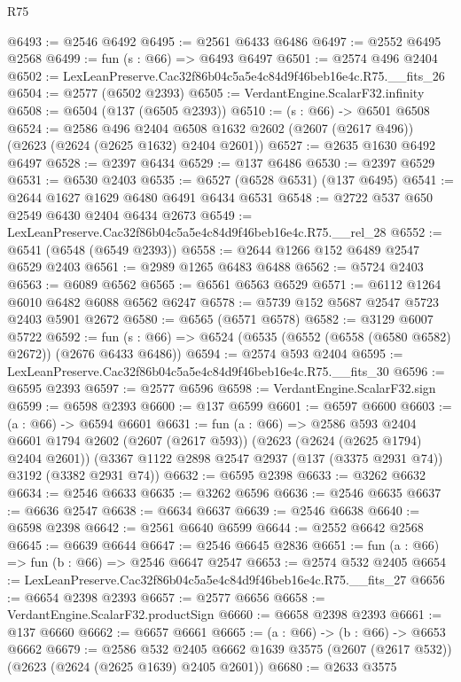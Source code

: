 \begin{lexlean}{R75}
\begin{coremodule}
@6493 := @2546 @6492
@6495 := @2561 @6433 @6486
@6497 := @2552 @6495 @2568
@6499 := fun (s : @66) => @6493 @6497
@6501 := @2574 @496 @2404
@6502 := LexLeanPreserve.Cac32f86b04c5a5e4c84d9f46beb16e4c.R75.__fits_26
@6504 := @2577 (@6502 @2393)
@6505 := VerdantEngine.ScalarF32.infinity
@6508 := @6504 (@137 (@6505 @2393))
@6510 := (s : @66) -> @6501 @6508
@6524 := @2586
    @496
    @2404
    @6508
    @1632
    @2602
    (@2607 (@2617 @496))
    (@2623 (@2624 (@2625 @1632) @2404 @2601))
@6527 := @2635 @1630 @6492 @6497
@6528 := @2397 @6434
@6529 := @137 @6486
@6530 := @2397 @6529
@6531 := @6530 @2403
@6535 := @6527 (@6528 @6531) (@137 @6495)
@6541 := @2644 @1627 @1629 @6480 @6491 @6434 @6531
@6548 := @2722 @537 @650 @2549 @6430 @2404 @6434 @2673
@6549 := LexLeanPreserve.Cac32f86b04c5a5e4c84d9f46beb16e4c.R75.__rel_28
@6552 := @6541 (@6548 (@6549 @2393))
@6558 := @2644 @1266 @152 @6489 @2547 @6529 @2403
@6561 := @2989 @1265 @6483 @6488
@6562 := @5724 @2403
@6563 := @6089 @6562
@6565 := @6561 @6563 @6529
@6571 := @6112 @1264 @6010 @6482 @6088 @6562 @6247
@6578 := @5739 @152 @5687 @2547 @5723 @2403 @5901 @2672
@6580 := @6565 (@6571 @6578)
@6582 := @3129 @6007 @5722
@6592 := fun (s : @66) => @6524 (@6535 (@6552 (@6558 (@6580 @6582) @2672)) (@2676 @6433 @6486))
@6594 := @2574 @593 @2404
@6595 := LexLeanPreserve.Cac32f86b04c5a5e4c84d9f46beb16e4c.R75.__fits_30
@6596 := @6595 @2393
@6597 := @2577 @6596
@6598 := VerdantEngine.ScalarF32.sign
@6599 := @6598 @2393
@6600 := @137 @6599
@6601 := @6597 @6600
@6603 := (a : @66) -> @6594 @6601
@6631 := fun (a : @66) =>
  @2586
    @593
    @2404
    @6601
    @1794
    @2602
    (@2607 (@2617 @593))
    (@2623 (@2624 (@2625 @1794) @2404 @2601))
    (@3367 @1122 @2898 @2547 @2937 (@137 (@3375 @2931 @74)) @3192 (@3382 @2931 @74))
@6632 := @6595 @2398
@6633 := @3262 @6632
@6634 := @2546 @6633
@6635 := @3262 @6596
@6636 := @2546 @6635
@6637 := @6636 @2547
@6638 := @6634 @6637
@6639 := @2546 @6638
@6640 := @6598 @2398
@6642 := @2561 @6640 @6599
@6644 := @2552 @6642 @2568
@6645 := @6639 @6644
@6647 := @2546 @6645 @2836
@6651 := fun (a : @66) => fun (b : @66) => @2546 @6647 @2547
@6653 := @2574 @532 @2405
@6654 := LexLeanPreserve.Cac32f86b04c5a5e4c84d9f46beb16e4c.R75.__fits_27
@6656 := @6654 @2398 @2393
@6657 := @2577 @6656
@6658 := VerdantEngine.ScalarF32.productSign
@6660 := @6658 @2398 @2393
@6661 := @137 @6660
@6662 := @6657 @6661
@6665 := (a : @66) -> (b : @66) -> @6653 @6662
@6679 := @2586
    @532
    @2405
    @6662
    @1639
    @3575
    (@2607 (@2617 @532))
    (@2623 (@2624 (@2625 @1639) @2405 @2601))
@6680 := @2633 @3575

\end{coremodule}
\end{lexlean}
